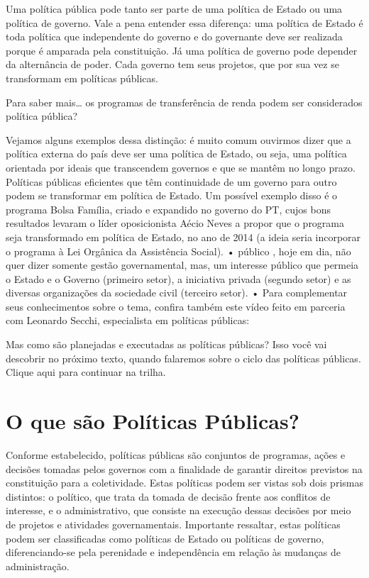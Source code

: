 \documentclass[
   article,       
   12pt,          
   oneside,       
   a4paper,       
   english,       
   brazil,        
   sumario=tradicional
   ]{abntex2}
\begin{document}
Uma política pública pode tanto ser parte de uma política de Estado ou uma política de governo. Vale a pena entender essa diferença: uma política de Estado é toda política que independente do governo e do governante deve ser realizada porque é amparada pela constituição. Já uma política de governo pode depender da alternância de poder. Cada governo tem seus projetos, que por sua vez se transformam em políticas públicas.

Para saber mais… os programas de transferência de renda podem ser considerados política pública?

Vejamos alguns exemplos dessa distinção: é muito comum ouvirmos dizer que a política externa do país deve ser uma política de Estado, ou seja, uma política orientada por ideais que transcendem governos e que se mantêm no longo prazo. Políticas públicas eficientes que têm continuidade de um governo para outro podem se transformar em política de Estado. Um possível exemplo disso é o programa Bolsa Família, criado e expandido no governo do PT, cujos bons resultados levaram o líder oposicionista Aécio Neves a propor que o programa seja transformado em política de Estado, no ano de 2014 (a ideia seria incorporar o programa à Lei Orgânica da Assistência Social).
• público , hoje em dia, não quer dizer somente gestão governamental, mas, um interesse público que permeia o Estado e o Governo (primeiro setor), a iniciativa privada (segundo setor) e as diversas organizações da sociedade civil (terceiro setor).
• Para complementar seus conhecimentos sobre o tema, confira também este vídeo feito em parceria com Leonardo Secchi, especialista em políticas públicas:

Mas como são planejadas e executadas as políticas públicas? Isso você vai descobrir no próximo texto, quando falaremos sobre o ciclo das políticas públicas. Clique aqui para continuar na trilha.

\section{O que são Políticas Públicas?}
Conforme estabelecido, políticas públicas são conjuntos de programas, ações e decisões tomadas pelos governos com a finalidade de garantir direitos previstos na constituição para a coletividade. Estas políticas podem ser vistas sob dois prismas distintos: o político, que trata da tomada de decisão frente aos conflitos de interesse, e o administrativo, que consiste na execução dessas decisões por meio de projetos e atividades governamentais. Importante ressaltar, estas políticas podem ser classificadas como políticas de Estado ou políticas de governo, diferenciando-se pela perenidade e independência em relação às mudanças de administração.
\end{document}
